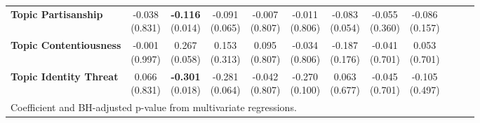 \begin{landscape}
\begin{tabular}{lccccccccccc}
\textbf{Topic Partisanship} & \makecell{-0.038\\(0.831)} & \makecell{\textbf{-0.116}\\(0.014)} & \makecell{-0.091\\(0.065)} & \makecell{-0.007\\(0.807)} & \makecell{-0.011\\(0.806)} & \makecell{-0.083\\(0.054)} & \makecell{-0.055\\(0.360)} & \makecell{-0.086\\(0.157)} \\
\textbf{Topic Contentiousness} & \makecell{-0.001\\(0.997)} & \makecell{0.267\\(0.058)} & \makecell{0.153\\(0.313)} & \makecell{0.095\\(0.807)} & \makecell{-0.034\\(0.806)} & \makecell{-0.187\\(0.176)} & \makecell{-0.041\\(0.701)} & \makecell{0.053\\(0.701)} \\
\textbf{Topic Identity Threat} & \makecell{0.066\\(0.831)} & \makecell{\textbf{-0.301}\\(0.018)} & \makecell{-0.281\\(0.064)} & \makecell{-0.042\\(0.807)} & \makecell{-0.270\\(0.100)} & \makecell{0.063\\(0.677)} & \makecell{-0.045\\(0.701)} & \makecell{-0.105\\(0.497)} \\
\hline
\multicolumn{12}{l}{\footnotesize Coefficient and BH-adjusted p-value from multivariate regressions.} \\
\end{tabular}
\end{landscape}